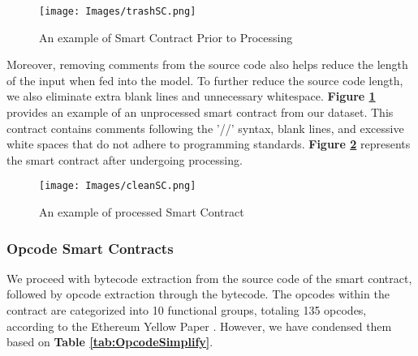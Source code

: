 \begin{figure}[h]
\centering
\texttt{[image: Images/trashSC.png]}
\caption{An example of Smart Contract Prior to Processing} \label{code:trashSC}
\end{figure}

Moreover, removing comments from the source code also helps reduce the length of the input when fed into the model. To further reduce the source code length, we also eliminate extra blank lines and unnecessary whitespace. \textbf{Figure \ref{code:trashSC}} provides an example of an unprocessed smart contract from our dataset. This contract contains comments following the '//' syntax, blank lines, and excessive white spaces that do not adhere to programming standards. \textbf{Figure \ref{code:cleanSC}} represents the smart contract after undergoing processing.

\begin{figure}[h]
\centering
\texttt{[image: Images/cleanSC.png]}
\caption{An example of processed Smart Contract} \label{code:cleanSC}
\end{figure}

\subsubsection{Opcode Smart Contracts}
We proceed with bytecode extraction from the source code of the smart contract, followed by opcode extraction through the bytecode. The opcodes within the contract are categorized into 10 functional groups, totaling 135 opcodes, according to the Ethereum Yellow Paper \cite{yellow_paper}. However, we have condensed them based on \textbf{Table \ref{tab:OpcodeSimplify}}.
\begin{table}[h]
    \caption{The simplified opcode methods}\label{tab:OpcodeSimplify}
    \begin{center}
    \end{center}
\end{table}

